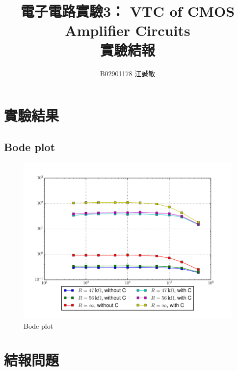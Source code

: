 \documentclass[12pt, a4paper]{article}
\title{ \bf {\Huge 電子電路實驗3： VTC of CMOS Amplifier Circuits  }\\ 實驗結報}
\author{B02901178 江誠敏}
\begin{document}
\maketitle


\section{實驗結果}

\subsection{Bode plot}
\begin{figure}[H]
\begin{center}
  \includegraphics[width=.8\textwidth]{fig1.pdf}
\end{center}
\caption{Bode plot}
\label{fig:}
\end{figure}


\section{結報問題}
\end{document}
